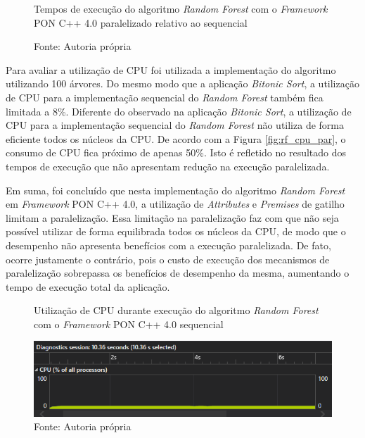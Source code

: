 \begin{figure}[!htb]
\centering
{}
\caption{Tempos de execução do algoritmo \textit{Random
Forest} com o \textit{Framework} PON C++ 4.0 paralelizado relativo ao sequencial}
\caption*{Fonte: Autoria própria}
\label{fig:random_forest_rel}
\end{figure}

Para avaliar a utilização de CPU foi utilizada a implementação do algoritmo
utilizando 100 árvores. Do mesmo modo que a aplicação \textit{Bitonic Sort}, a
utilização de CPU para a implementação sequencial do \textit{Random Forest}
também fica limitada a 8\%. Diferente do observado na aplicação \textit{Bitonic
Sort}, a utilização de CPU para a implementação sequencial do \textit{Random
Forest} não utiliza de forma eficiente todos os núcleos da CPU. De acordo com a
Figura \ref{fig:rf_cpu_par}, o consumo de CPU fica próximo de apenas 50\%. Isto
é refletido no resultado dos tempos de execução que não apresentam redução na
execução paralelizada.

Em suma, foi concluído que nesta implementação do algoritmo \textit{Random
Forest} em \textit{Framework} PON C++ 4.0, a utilização de \textit{Attributes} e
\textit{Premises} de gatilho limitam a paralelização. Essa limitação na
paralelização faz com que não seja possível utilizar de forma equilibrada todos
os núcleos da CPU, de modo que o desempenho não apresenta benefícios com a
execução paralelizada. De fato, ocorre justamente o contrário, pois o custo de
execução dos mecanismos de paralelização sobrepassa os benefícios de desempenho
da  mesma, aumentando o tempo de execução total da aplicação.

\begin{figure}[!htb]
\centering
\caption{Utilização de CPU durante execução do algoritmo \textit{Random Forest}
com o \textit{Framework} PON C++ 4.0 sequencial}
\includegraphics[width=\textwidth]{../figures/cpu_rf.png}
\smallskip
\caption*{Fonte: Autoria própria}
\label{fig:rf_cpu}
\end{figure}

